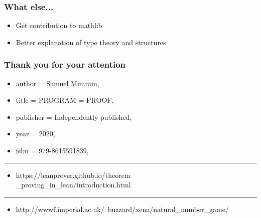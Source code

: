\documentclass{beamer}
\begin{document}
\begin{frame}
    \frametitle{What else...}
    \begin{itemize}
        \item Get contribution to mathlib
        \item Better explanation of type theory and structures
    \end{itemize}
\end{frame}
\begin{frame}
    \frametitle{Thank you for your attention}
    \begin{itemize}
        \item author = Samuel Mimram,
        \item title = PROGRAM = PROOF,
        \item publisher = Independently published,
        \item year = 2020,
        \item isbn = 979-8615591839,
    \end{itemize}
    \color{black}\rule{\linewidth}{1pt}
    \begin{itemize}
        \item https://leanprover.github.io/theorem \\
            \_proving\_in\_lean/introduction.html
    \end{itemize}
    \color{black}\rule{\linewidth}{1pt}
    \begin{itemize}
        \item http://wwwf.imperial.ac.uk/~buzzard/xena/natural\_number\_game/
    \end{itemize}
\end{frame}
\end{document}
